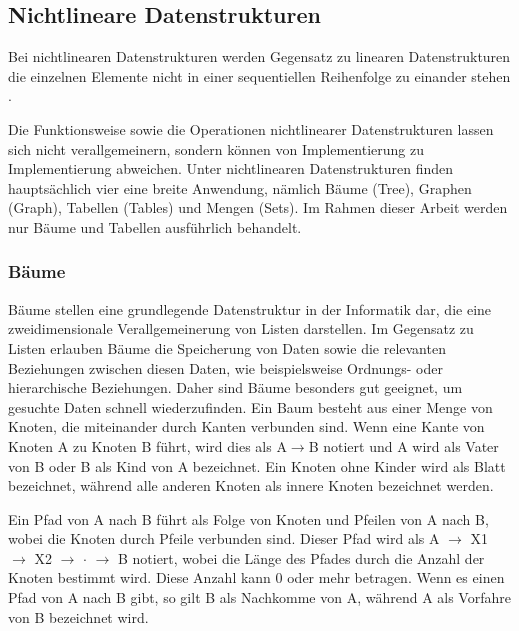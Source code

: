 \subsection{Nichtlineare Datenstrukturen}
Bei nichtlinearen Datenstrukturen werden Gegensatz zu linearen Datenstrukturen die einzelnen Elemente nicht in einer sequentiellen Reihenfolge zu einander stehen \autocite[321]{hoffmann_einfuhrung_2011}. 

Die Funktionsweise sowie die Operationen nichtlinearer Datenstrukturen lassen sich nicht verallgemeinern, sondern können von Implementierung zu Implementierung abweichen. Unter nichtlinearen Datenstrukturen finden hauptsächlich vier eine breite Anwendung, nämlich Bäume (Tree), Graphen (Graph), Tabellen (Tables) und Mengen (Sets). Im Rahmen dieser Arbeit werden nur Bäume und Tabellen ausführlich behandelt.

\subsubsection{Bäume}
Bäume stellen eine grundlegende Datenstruktur in der Informatik dar, die eine zweidimensionale Verallgemeinerung von Listen darstellen. Im Gegensatz zu Listen erlauben Bäume die Speicherung von Daten sowie die relevanten Beziehungen zwischen diesen Daten, wie beispielsweise Ordnungs- oder hierarchische Beziehungen. Daher sind Bäume besonders gut geeignet, um gesuchte Daten schnell wiederzufinden. Ein Baum besteht aus einer Menge von Knoten, die miteinander durch Kanten verbunden sind. Wenn eine Kante von Knoten A zu Knoten B führt, wird dies als A$\rightarrow$B notiert und A wird als Vater von B oder B als Kind von A bezeichnet. Ein Knoten ohne Kinder wird als Blatt bezeichnet, während alle anderen Knoten als innere Knoten bezeichnet werden. \autocite[389]{gumm_band_2016}

Ein Pfad von A nach B führt als Folge von Knoten und Pfeilen von A nach B, wobei die Knoten durch Pfeile verbunden sind. Dieser Pfad wird als A $\rightarrow$ X1 $\rightarrow$ X2 $\rightarrow$ $\cdot$ $\rightarrow$ B notiert, wobei die Länge des Pfades durch die Anzahl der Knoten bestimmt wird. Diese Anzahl kann 0 oder mehr betragen. Wenn es einen Pfad von A nach B gibt, so gilt B als Nachkomme von A, während A als Vorfahre von B bezeichnet wird. \autocite[389]{gumm_band_2016}

